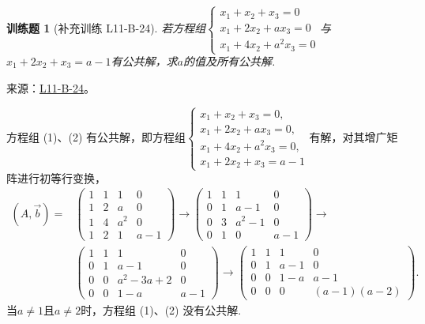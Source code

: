 \documentclass[12pt,fontset=fandol]{ctexart}
\newtheorem{exercise}{训练题}[section]
\begin{document}
\begin{exercise}[补充训练 L11-B-24]\label{prob:L11-B-24}
若方程组$\begin{cases}
                x_1+x_2+x_3=0   \\
                x_1+2x_2+ax_3=0 \\
                x_1+4x_2+a^2x_3=0
            \end{cases}$与$x_1+2x_2+x_3=a-1$有公共解，求$a$的值及所有公共解.
\end{exercise}
\noindent 来源：\href{https://github.com/yhwu-is/Linear-Algebra-Left-Undone/blob/new/%E8%AE%B2%E4%B9%89/%E4%B8%93%E9%A2%98/11%20%E6%9C%9D%E8%8A%B1%E5%A4%95%E6%8B%BE.tex}{L11-B-24}。
\begin{solve}
方程组 (1)、(2) 有公共解，即方程组$\begin{cases}
                x_1+x_2+x_3=0,     \\
                x_1+2x_2+ax_3=0,   \\
                x_1+4x_2+a^2x_3=0, \\
                x_1+2x_2+x_3=a-1
            \end{cases}$有解，对其增广矩阵进行初等行变换，
        \begin{align*}
            (A,\vec{b})= & \begin{pmatrix}
                           1 & 1 & 1   & 0   \\
                           1 & 2 & a   & 0   \\
                           1 & 4 & a^2 & 0   \\
                           1 & 2 & 1   & a-1
                       \end{pmatrix}\rightarrow
            \begin{pmatrix}
                1 & 1 & 1     & 0   \\
                0 & 1 & a-1   & 0   \\
                0 & 3 & a^2-1 & 0   \\
                0 & 1 & 0     & a-1
            \end{pmatrix}\rightarrow            \\
                     & \begin{pmatrix}
                           1 & 1 & 1        & 0   \\
                           0 & 1 & a-1      & 0   \\
                           0 & 0 & a^2-3a+2 & 0   \\
                           0 & 0 & 1-a      & a-1
                       \end{pmatrix}\rightarrow
            \begin{pmatrix}
                1 & 1 & 1   & 0          \\
                0 & 1 & a-1 & 0          \\
                0 & 0 & 1-a & a-1        \\
                0 & 0 & 0   & (a-1)(a-2)
            \end{pmatrix}.
        \end{align*}
        当$a\neq 1$且$a\neq 2$时，方程组 (1)、(2) 没有公共解.


\end{solve}
\end{document}
